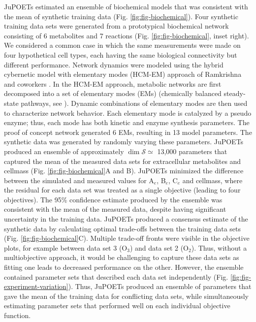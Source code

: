 \documentclass{bmcart}
\begin{document}
JuPOETs estimated an ensemble of biochemical models that was consistent with the mean of synthetic training data (Fig. \ref{fig:fig-biochemical}).
Four synthetic training data sets were generated from a prototypical biochemical network consisting of 6 metabolites and 7 reactions (Fig. \ref{fig:fig-biochemical}, inset right).
We considered a common case in which the same measurements were made on four hypothetical cell types, each having the same biological connectivity but different performance.
Network dynamics were modeled using the hybrid cybernetic model with elementary modes (HCM-EM) approach of Ramkrishna and coworkers \cite{2008_kim_varner_ramkrishna_BiotechProg}.
In the HCM-EM approach, metabolic networks are first decomposed into a set of elementary modes (EMs) (chemically balanced steady-state pathways, see \cite{Schuster:2000aa}).
Dynamic combinations of elementary modes are then used to characterize network behavior.
Each elementary mode is catalyzed by a pseudo enzyme; thus, each mode has both kinetic and enzyme synthesis parameters.
The proof of concept network generated 6 EMs, resulting in 13 model parameters.
The synthetic data was generated by randomly varying these parameters.
JuPOETs produced an ensemble of approximately $\dim{\mathcal{S}}\simeq$ 13,000 parameters that captured the mean of the measured data sets for extracellular metabolites and cellmass
(Fig. \ref{fig:fig-biochemical}A and B). JuPOETs minimized the difference between the simulated and measured values for A$_{e}$, B$_{e}$, C$_{e}$ and cellmass,
where the residual for each data set was treated as a single objective (leading to four objectives).
The 95\% confidence estimate produced by the ensemble was consistent with the mean of the measured data, despite having significant
uncertainty in the training data. JuPOETs produced a consensus estimate of the synthetic data by calculating optimal trade-offs between the training data sets (Fig. \ref{fig:fig-biochemical}C). Multiple trade-off fronts were visible in the objective plots, for example between data set 3 (O$_{3}$) and data set 2 (O$_{2}$).
Thus, without a multiobjective approach, it would be challenging to capture these data sets as fitting one leads to decreased performance on the other.
However, the ensemble contained parameter sets that described each data set independently (Fig. \ref{fig:fig-experiment-variation}).
Thus, JuPOETs produced an ensemble of parameters that gave the mean of the training data for conflicting data sets,
while simultaneously estimating parameter sets that performed well on each individual objective function.
\end{document}
